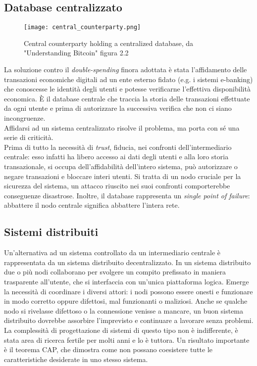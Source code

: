 	\subsection{Database centralizzato}
		\begin{figure}[ht]
			\centering
			\texttt{[image: central\_counterparty.png]}
			\caption{Central counterparty holding a centralized database, da "Understanding Bitcoin" \cite{understanding_bitcoin} figura 2.2}
			\label{fig:central_counterparty_img}
		\end{figure}
		La soluzione contro il \emph{double-spending} finora adottata è stata l'affidamento delle transazioni economiche digitali ad un ente esterno fidato (e.g. i sistemi e-banking) che conoscesse le identità degli utenti e potesse verificarne l'effettiva disponibilità economica. È il database centrale che traccia la storia delle transazioni effettuate da ogni utente e prima di autorizzare la successiva verifica che non ci siano incongruenze. \\
		Affidarsi ad un sistema centralizzato risolve il problema, ma porta con sé una serie di criticità. \\
		Prima di tutto la necessità di \emph{trust}, fiducia, nei confronti dell'intermediario centrale: esso infatti ha libero accesso ai dati degli utenti e alla loro storia transazionale, si occupa dell'affidabilità dell'intero sistema, può autorizzare o negare transazioni e bloccare interi utenti. Si tratta di un nodo cruciale per la sicurezza del sistema, un attacco riuscito nei suoi confronti comporterebbe conseguenze disastrose. Inoltre, il database rappresenta un \emph{single point of failure}: abbattere il nodo centrale significa abbattere l'intera rete.

	\subsection{Sistemi distribuiti}
		Un'alternativa ad un sistema controllato da un intermediario centrale è rappresentata da un sistema distribuito decentralizzato. In un sistema distribuito due o più nodi collaborano per svolgere un compito prefissato in maniera trasparente all'utente, che si interfaccia con un'unica piattaforma logica. Emerge la necessità di coordinare i diversi attori: i nodi possono essere onesti e funzionare in modo corretto oppure difettosi, mal funzionanti o maliziosi. Anche se qualche nodo si rivelasse difettoso o la connessione venisse a mancare, un buon sistema distribuito dovrebbe assorbire l'imprevisto e continuare a lavorare senza problemi. La complessità di progettazione di sistemi di questo tipo non è indifferente, è stata area di ricerca fertile per molti anni e lo è tuttora. Un risultato importante è il teorema CAP, che dimostra come non possano coesistere tutte le caratteristiche desiderate in uno stesso sistema.

